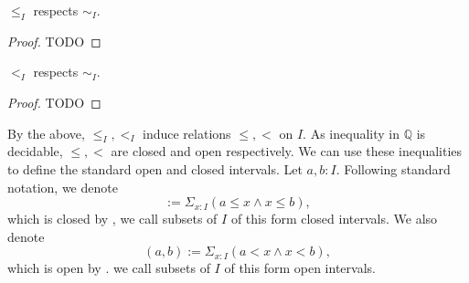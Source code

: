 \begin{lemma}
  $\leq_I$ respects $\sim_I$. 
\end{lemma}
\begin{proof}
  TODO
%
\end{proof}
\begin{lemma}
  $<_I$ respects $\sim_I$. 
\end{lemma} 
\begin{proof}
  TODO
\end{proof}
\begin{remark}
  By the above, $\leq_I, <_I$ induce relations $\leq,<$ on $I$.
  As inequality in $\mathbb Q$ is decidable, $\leq, <$ are closed and open respectively. 
%
  We can use these inequalities to define the standard open and closed intervals. 
  Let $a,b:I$. 
  Following standard notation, we denote
  \begin{equation}
    [a,b]:= \Sigma_{x:I} (a\leq x \wedge x \leq b),
  \end{equation}
  which is closed by , 
  we call subsets of $I$ of this form closed intervals. 
%
  We also denote 
  \begin{equation}
    (a,b) := \Sigma_{x:I} (a < x \wedge x < b),
  \end{equation}
  which is open by .
  we call subsets of $I$ of this form open intervals. 
\end{remark}

